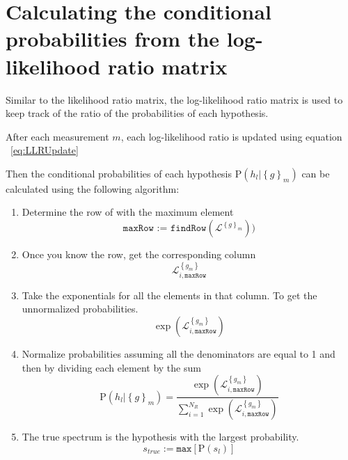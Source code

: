 \section{Calculating the conditional probabilities from the log-likelihood ratio matrix}

Similar to the likelihood ratio matrix, the log-likelihood ratio matrix is used to keep track of the ratio of the probabilities of each hypothesis.

After each measurement $m$, each log-likelihood ratio is updated using equation ~\ref{eq:LLRUpdate}

Then the conditional probabilities of each hypothesis $\mbox{P}(h_l | \left\{ g \right\}_m)$ can be calculated using the following algorithm:

\begin{enumerate}
    \item Determine the row of with the maximum element
    \begin{equation}
    \texttt{maxRow := } \texttt{findRow}(\pmb{\mathscr{L}}^{\left\{ g \right\}_m}))
    \end{equation}
    \item Once you know the row, get the corresponding column
    \begin{equation}
    \mathscr{L}_{i,\texttt{maxRow}}^{ \left\{ g_{m} \right\} }
    \end{equation}
    \item Take the exponentials for all the elements in that column. To get the unnormalized probabilities.
    \begin{equation}
    \exp ( \mathscr{L}_{i,\texttt{maxRow}}^{ \left\{g_{m} \right\} } )
    \end{equation}
    \item Normalize probabilities assuming all the denominators are equal to 1 and then by dividing each element by the sum
    \begin{equation}
    \mbox{P}(h_l | \left\{ g \right\}_m )
    =
    \frac
    {
        \exp ( \mathscr{L}_{i,\texttt{maxRow}}^{ \left\{g_{m} \right\} } )
    }
    {
        \sum_{i = 1}^{N_R} \exp ( \mathscr{L}_{i,\texttt{maxRow}}^{ \left\{g_{m} \right\} } )
    }
    \end{equation}
    \item The true spectrum is the hypothesis with the largest probability.
    \begin{equation}
        s_{true} := \texttt{max}\left[\mbox{P}(s_{l}) \right]
    \end{equation}
\end{enumerate}

